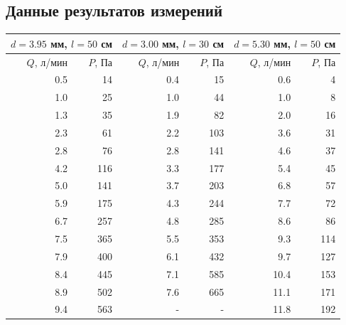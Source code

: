 \documentclass[12pt]{article}
\begin{document}
\subsection{Данные результатов измерений} \label{app_2}
\begin{table}[H]
    \centering
    \begin{tabular}{|r|r|r|r|r|r|}
        \hline
        \multicolumn{2}{|c|}{$d = 3.95$ мм, $l = 50$ см} & 
        \multicolumn{2}{|c|}{$d = 3.00$ мм, $l = 30$ см} & 
        \multicolumn{2}{|c|}{$d = 5.30$ мм, $l = 50$ см}                                                         \\
        \hline
        $Q$, л/мин                                       & $P$, Па & $Q$, л/мин & $P$, Па & $Q$, л/мин & $P$, Па \\
        \hline
        0.5                                              & 14      & 0.4        & 15      & 0.6        & 4       \\ 
        1.0                                              & 25      & 1.0        & 44      & 1.0        & 8       \\ 
        1.3                                              & 35      & 1.9        & 82      & 2.0        & 16      \\ 
        2.3                                              & 61      & 2.2        & 103     & 3.6        & 31      \\ 
        2.8                                              & 76      & 2.8        & 141     & 4.6        & 37      \\ 
        4.2                                              & 116     & 3.3        & 177     & 5.4        & 45      \\ 
        5.0                                              & 141     & 3.7        & 203     & 6.8        & 57      \\ 
        5.9                                              & 175     & 4.3        & 244     & 7.7        & 72      \\ 
        6.7                                              & 257     & 4.8        & 285     & 8.6        & 86      \\ 
        7.5                                              & 365     & 5.5        & 353     & 9.3        & 114     \\ 
        7.9                                              & 400     & 6.1        & 432     & 9.7        & 127     \\ 
        8.4                                              & 445     & 7.1        & 585     & 10.4       & 153     \\ 
        8.9                                              & 502     & 7.6        & 665     & 11.1       & 171     \\ 
        9.4                                              & 563     & -          & -       & 11.8       & 192     \\ 
        \hline
    \end{tabular}
    

\end{table}
\end{document}
